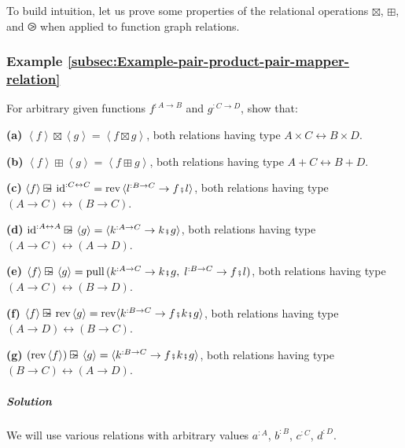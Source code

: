 To build intuition, let us prove some properties of the relational
operations $\boxtimes$, $\boxplus$, and $\ogreaterthan$ when applied
to function graph relations.

\subsubsection{Example \label{subsec:Example-pair-product-pair-mapper-relation}\ref{subsec:Example-pair-product-pair-mapper-relation}}

For arbitrary given functions $f^{:A\rightarrow B}$ and $g^{:C\rightarrow D}$,
show that:

\textbf{(a)} $\left<f\right>\boxtimes\left<g\right>=\left<f\boxtimes g\right>$,
both relations having type $A\times C\leftrightarrow B\times D$.

\textbf{(b)} $\left<f\right>\boxplus\left<g\right>=\left<f\boxplus g\right>$,
both relations having type $A+C\leftrightarrow B+D$.

\textbf{(c)} $\left<f\right>\ogreaterthan\text{id}^{:C\leftrightarrow C}=\text{rev}\,\langle l^{:B\rightarrow C}\rightarrow f\bef l\rangle$,
both relations having type $\left(A\rightarrow C\right)\leftrightarrow\left(B\rightarrow C\right)$.

\textbf{(d)} $\text{id}^{:A\leftrightarrow A}\ogreaterthan\left<g\right>=\langle k^{:A\rightarrow C}\rightarrow k\bef g\rangle$,
both relations having type $\left(A\rightarrow C\right)\leftrightarrow\left(A\rightarrow D\right)$.

\textbf{(e)} $\left<f\right>\ogreaterthan\left<g\right>=\text{pull}\,(k^{:A\rightarrow C}\rightarrow k\bef g,\;l^{:B\rightarrow C}\rightarrow f\bef l)$,
both relations having type $\left(A\rightarrow C\right)\leftrightarrow\left(B\rightarrow D\right)$.

\textbf{(f)} $\left<f\right>\ogreaterthan\text{rev}\left<g\right>=\text{rev}\langle k^{:B\rightarrow C}\rightarrow f\bef k\bef g\rangle$,
both relations having type $\left(A\rightarrow D\right)\leftrightarrow\left(B\rightarrow C\right)$.

\textbf{(g)} $(\text{rev}\left<f\right>)\ogreaterthan\left<g\right>=\langle k^{:B\rightarrow C}\rightarrow f\bef k\bef g\rangle$,
both relations having type $\left(B\rightarrow C\right)\leftrightarrow\left(A\rightarrow D\right)$.

\subparagraph{Solution}

We will use various relations with arbitrary values $a^{:A}$, $b^{:B}$,
$c^{:C}$, $d^{:D}$.

